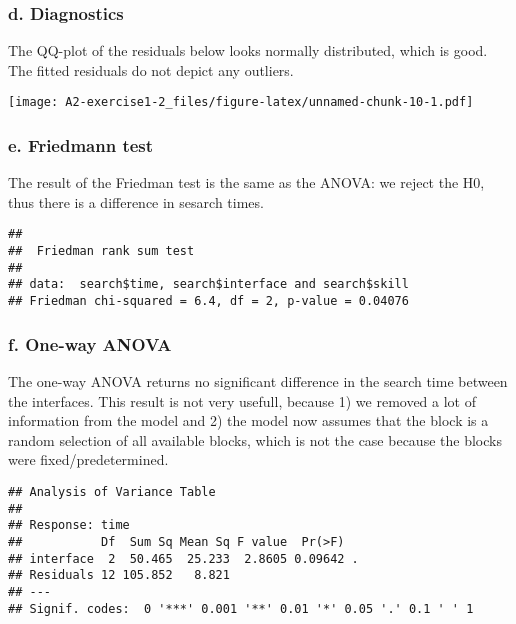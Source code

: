 \documentclass[]{article}
\begin{document}
\hypertarget{d.-diagnostics}{%
\subsubsection{d. Diagnostics}\label{d.-diagnostics}}

The QQ-plot of the residuals below looks normally distributed, which is
good. The fitted residuals do not depict any outliers.

\texttt{[image: A2-exercise1-2\_files/figure-latex/unnamed-chunk-10-1.pdf]}

\hypertarget{e.-friedmann-test}{%
\subsubsection{e. Friedmann test}\label{e.-friedmann-test}}

The result of the Friedman test is the same as the ANOVA: we reject the
H0, thus there is a difference in sesarch times.

\begin{verbatim}
## 
##  Friedman rank sum test
## 
## data:  search$time, search$interface and search$skill
## Friedman chi-squared = 6.4, df = 2, p-value = 0.04076
\end{verbatim}

\hypertarget{f.-one-way-anova}{%
\subsubsection{f. One-way ANOVA}\label{f.-one-way-anova}}

The one-way ANOVA returns no significant difference in the search time
between the interfaces. This result is not very usefull, because 1) we
removed a lot of information from the model and 2) the model now assumes
that the block is a random selection of all available blocks, which is
not the case because the blocks were fixed/predetermined.

\begin{verbatim}
## Analysis of Variance Table
## 
## Response: time
##           Df  Sum Sq Mean Sq F value  Pr(>F)  
## interface  2  50.465  25.233  2.8605 0.09642 .
## Residuals 12 105.852   8.821                  
## ---
## Signif. codes:  0 '***' 0.001 '**' 0.01 '*' 0.05 '.' 0.1 ' ' 1
\end{verbatim}
\end{document}
